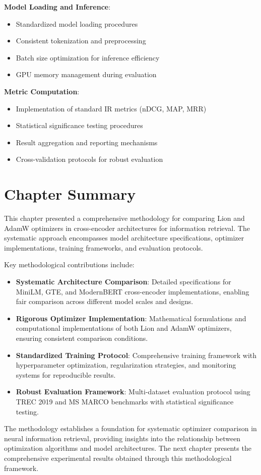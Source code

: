 \textbf{Model Loading and Inference}:
\begin{itemize}
    \item Standardized model loading procedures
    \item Consistent tokenization and preprocessing
    \item Batch size optimization for inference efficiency
    \item GPU memory management during evaluation
\end{itemize}

\textbf{Metric Computation}:
\begin{itemize}
    \item Implementation of standard IR metrics (nDCG, MAP, MRR)
    \item Statistical significance testing procedures
    \item Result aggregation and reporting mechanisms
    \item Cross-validation protocols for robust evaluation
\end{itemize}

\section{Chapter Summary}

This chapter presented a comprehensive methodology for comparing Lion and AdamW optimizers in cross-encoder architectures for information retrieval. The systematic approach encompasses model architecture specifications, optimizer implementations, training frameworks, and evaluation protocols.

Key methodological contributions include:

\begin{itemize}
    \item \textbf{Systematic Architecture Comparison}: Detailed specifications for MiniLM, GTE, and ModernBERT cross-encoder implementations, enabling fair comparison across different model scales and designs.
    
    \item \textbf{Rigorous Optimizer Implementation}: Mathematical formulations and computational implementations of both Lion and AdamW optimizers, ensuring consistent comparison conditions.
    
    \item \textbf{Standardized Training Protocol}: Comprehensive training framework with hyperparameter optimization, regularization strategies, and monitoring systems for reproducible results.
    
    \item \textbf{Robust Evaluation Framework}: Multi-dataset evaluation protocol using TREC 2019 and MS MARCO benchmarks with statistical significance testing.
\end{itemize}

The methodology establishes a foundation for systematic optimizer comparison in neural information retrieval, providing insights into the relationship between optimization algorithms and model architectures. The next chapter presents the comprehensive experimental results obtained through this methodological framework.
 

